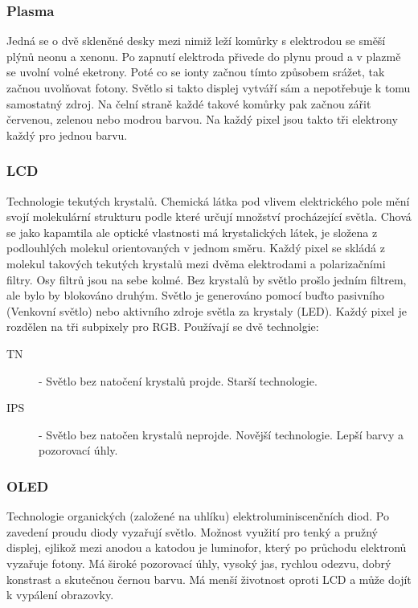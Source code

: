 \subsubsection{Plasma}
Jedná se o dvě skleněné desky mezi nimiž leží komůrky s elektrodou se směší plýnů neonu a xenonu.
Po zapnutí elektroda přivede do plynu proud a v plazmě se uvolní volné eketrony.
Poté co se ionty začnou tímto způsobem srážet, tak začnou uvolňovat fotony.
Světlo si takto displej vytváří sám a nepotřebuje k tomu samostatný zdroj.
Na čelní straně každé takové komůrky pak začnou zářit červenou, zelenou nebo modrou barvou.
Na každý pixel jsou takto tři elektrony každý pro jednou barvu.
\subsubsection{LCD}
Technologie tekutých krystalů.
Chemická látka pod vlivem elektrického pole mění svojí molekulární strukturu podle které určují množství procházející světla.
Chová se jako kapamtila ale optické vlastnosti má krystalických látek, je složena z podlouhlých molekul orientovaných v jednom směru.
Každý pixel se skládá z molekul takových tekutých krystalů mezi dvěma elektrodami a polarizačními filtry.
Osy filtrů jsou na sebe kolmé.
Bez krystalů by světlo prošlo jedním filtrem, ale bylo by blokováno druhým.
Světlo je generováno pomocí buďto pasivního (Venkovní světlo) nebo aktivního zdroje světla za krystaly (LED).
Každý pixel je rozdělen na tři subpixely pro RGB.
Používají se dvě technolgie:\\
\begin{description}
  \item[TN]- Světlo bez natočení krystalů projde. Starší technologie.
  \item[IPS]- Světlo bez natočen krystalů neprojde. Novější technologie. Lepší barvy a pozorovací úhly.
\end{description}
\subsubsection{OLED}
Technologie organických (založené na uhlíku) elektroluminiscenčních diod.
Po zavedení proudu diody vyzařují světlo.
Možnost využití pro tenký a pružný displej, ejlikož mezi anodou a katodou je luminofor, který po průchodu elektronů vyzařuje fotony.
Má široké pozorovací úhly, vysoký jas, rychlou odezvu, dobrý konstrast a skutečnou černou barvu.
Má menší životnost oproti LCD a může dojít k vypálení obrazovky.
